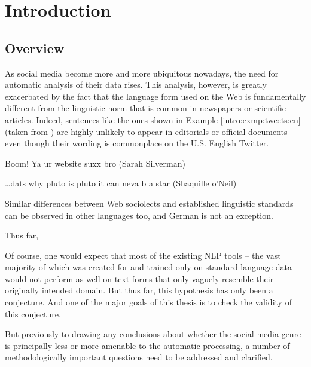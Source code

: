 

\chapter{Introduction}

\section{Overview}
As social media become more and more ubiquitous nowadays, the need for
automatic analysis of their data rises.  This analysis, however, is greatly
exacerbated by the fact that the language form used on the Web is
fundamentally different from the linguistic norm that is common in newspapers
or scientific articles.  Indeed, sentences like the ones shown in Example
\ref{intro:exmp:tweets:en} (taken from \citet{Eisenstein:13}) are highly
unlikely to appear in editorials or official documents even though their
wording is commonplace on the U.S. English Twitter.
\begin{example}\label{intro:exmp:tweets:en}
Boom! Ya ur website suxx bro {\upshape (Sarah Silverman)}

\dots dats why pluto is pluto it can neva b a star {\upshape (Shaquille o'Neil)}
\end{example}
Similar differences between Web sociolects and established linguistic
standards can be observed in other languages too, and German is not an
exception.

Thus far,

Of course, one would expect that most of the existing NLP tools -- the vast
majority of which was created for and trained only on standard language data
-- would not perform as well on text forms that only vaguely resemble their
originally intended domain.  But thus far, this hypothesis has only been a
conjecture.  And one of the major goals of this thesis is to check the
validity of this conjecture.

But previously to drawing any conclusions about whether the social media genre
is principally less or more amenable to the automatic processing, a number of
methodologically important questions need to be addressed and clarified.

